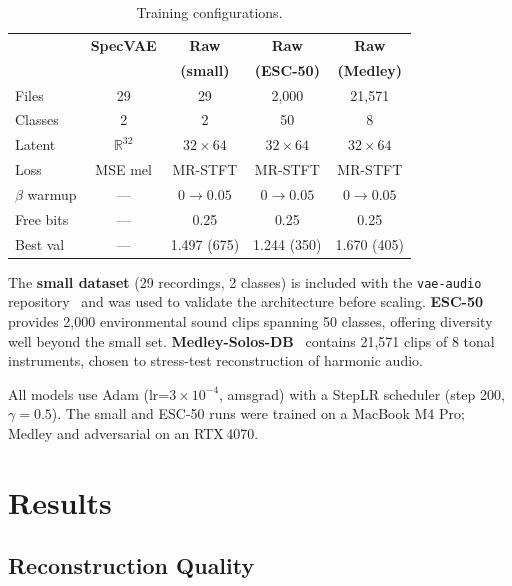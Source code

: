 \documentclass[10pt, twocolumn]{article}
\begin{document}
\begin{table}[h]
    \centering
    \caption{Training configurations.}
    \label{tab:training}
    \renewcommand{\arraystretch}{1.15}
    \footnotesize
    \begin{tabular}{l c c c c}
        \toprule
        & \textbf{SpecVAE} & \textbf{Raw} & \textbf{Raw} & \textbf{Raw} \\
        &                  & \textbf{(small)} & \textbf{(ESC-50)} & \textbf{(Medley)} \\
        \midrule
        Files     & 29      & 29      & 2{,}000 & 21{,}571 \\
        Classes   & 2       & 2       & 50      & 8 \\
        Latent    & $\mathbb{R}^{32}$ & $32{\times}64$ & $32{\times}64$ & $32{\times}64$ \\
        Loss      & MSE mel & MR-STFT & MR-STFT & MR-STFT \\
        $\beta$ warmup & --- & $0{\to}0.05$ & $0{\to}0.05$ & $0{\to}0.05$ \\
        Free bits & ---     & 0.25    & 0.25    & 0.25 \\
        Best val  & ---     & 1.497 (675) & 1.244 (350) & 1.670 (405) \\
        \bottomrule
    \end{tabular}
\end{table}

The \textbf{small dataset} (29 recordings, 2 classes) is
included with the \texttt{vae-audio} repository~\cite{yjlolo} and
was used to validate the architecture before scaling.
\textbf{ESC-50}~\cite{piczak2015} provides 2{,}000 environmental sound
clips spanning 50 classes, offering diversity well beyond the small set.
\textbf{Medley-Solos-DB}~\cite{lostanlen2019} contains 21{,}571 clips
of 8 tonal instruments, chosen to stress-test reconstruction of harmonic
audio.

All models use Adam (lr=$3{\times}10^{-4}$, amsgrad) with a StepLR scheduler
(step 200, $\gamma=0.5$). The small and ESC-50 runs were trained on a
MacBook M4 Pro; Medley and adversarial on an RTX\,4070.

\section{Results}
\label{sec:results}

\subsection{Reconstruction Quality}
\end{document}
